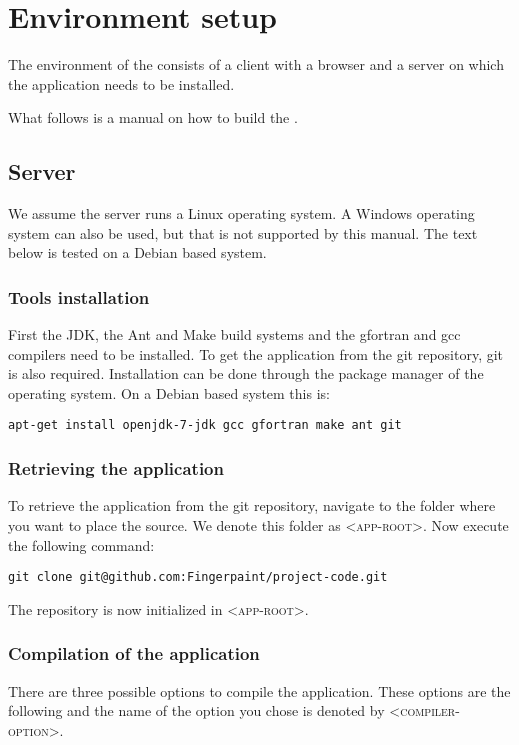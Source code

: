 \chapter{Environment setup}
\label{environment_setup}

The environment of the \applicationname{} consists of a client with a browser and a server on which the application needs to be installed.

What follows is a manual on how to build the \applicationname{}.

\section{Server}
We assume the server runs a Linux operating system. A Windows operating system can also be used, but that is not supported by this manual. The text below is tested on a Debian based system.

\subsection{Tools installation}
\label{sec:building}
First the JDK, the Ant and Make build systems and the gfortran and gcc compilers need to be installed. To get the application from the git repository, git is also required. Installation can be done through the package manager of the operating system. On a Debian based system this is:

\begin{verbatim}
apt-get install openjdk-7-jdk gcc gfortran make ant git
\end{verbatim}

\subsection{Retrieving the application}
\label{sec:retrieving}
To retrieve the application from the git repository, navigate to the folder where you want to place the source.
We denote this folder as \textsc{<app-root>}. Now execute the following command:

\begin{verbatim}
git clone git@github.com:Fingerpaint/project-code.git
\end{verbatim}

The repository is now initialized in \textsc{<app-root>}.

\subsection{Compilation of the application}
\label{sec:compiling}
There are three possible options to compile the application. These options are the following and the name of the option you chose is denoted by \textsc{<compiler-option>}.

